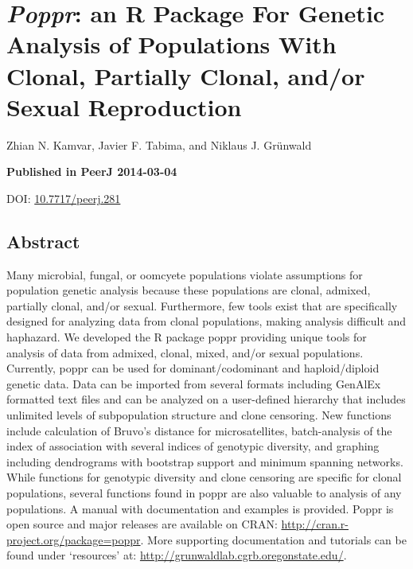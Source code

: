 \documentclass[double,12pt]{beavtex}
\begin{document}
  \chapter{\texorpdfstring{\emph{Poppr}: an R Package For Genetic Analysis
  of Populations With Clonal, Partially Clonal, and/or Sexual
  Reproduction}{Poppr: an R Package For Genetic Analysis of Populations With Clonal, Partially Clonal, and/or Sexual Reproduction}}\label{poppr-an-r-package-for-genetic-analysis-of-populations-with-clonal-partially-clonal-andor-sexual-reproduction}
  
  Zhian N. Kamvar, Javier F. Tabima, and Niklaus J. Grünwald
  
  \vspace*{\fill}
  
  \textbf{Published in PeerJ 2014-03-04}
  
  DOI: \href{https://dx.doi.org/10.7717/peerj.281}{10.7717/peerj.281}
  
  \newpage
  
  \section{Abstract}\label{abstract}
  
  Many microbial, fungal, or oomcyete populations violate assumptions for
  population genetic analysis because these populations are clonal,
  admixed, partially clonal, and/or sexual. Furthermore, few tools exist
  that are specifically designed for analyzing data from clonal
  populations, making analysis difficult and haphazard. We developed the R
  package poppr providing unique tools for analysis of data from admixed,
  clonal, mixed, and/or sexual populations. Currently, poppr can be used
  for dominant/codominant and haploid/diploid genetic data. Data can be
  imported from several formats including GenAlEx formatted text files and
  can be analyzed on a user-defined hierarchy that includes unlimited
  levels of subpopulation structure and clone censoring. New functions
  include calculation of Bruvo's distance for microsatellites,
  batch-analysis of the index of association with several indices of
  genotypic diversity, and graphing including dendrograms with bootstrap
  support and minimum spanning networks. While functions for genotypic
  diversity and clone censoring are specific for clonal populations,
  several functions found in poppr are also valuable to analysis of any
  populations. A manual with documentation and examples is provided. Poppr
  is open source and major releases are available on CRAN:
  \url{http://cran.r-project.org/package=poppr}. More supporting
  documentation and tutorials can be found under `resources' at:
  \url{http://grunwaldlab.cgrb.oregonstate.edu/}.
  
\end{document}
